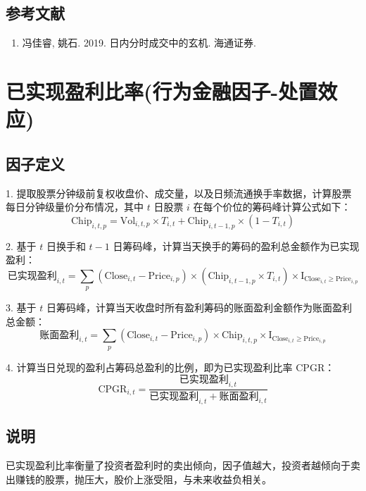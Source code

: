 \documentclass{article}
\begin{document}
\subsection{参考文献}
\begin{enumerate}
    \item 冯佳睿, 姚石. 2019. 日内分时成交中的玄机. 海通证券.
\end{enumerate}

\section{已实现盈利比率(行为金融因子-处置效应)}

\subsection{因子定义}

1. 提取股票分钟级前复权收盘价、成交量，以及日频流通换手率数据，计算股票每日分钟级量价分布情况，其中 \( t \) 日股票 \( i \) 在每个价位的筹码峰计算公式如下：
\begin{equation}
    \mathrm{Chip}_{i,t,p} = \mathrm{Vol}_{i,t,p} \times T_{i,t} + \mathrm{Chip}_{i,t-1,p} \times (1 - T_{i,t})
\end{equation}

2. 基于 \( t \) 日换手和 \( t-1 \) 日筹码峰，计算当天换手的筹码的盈利总金额作为已实现盈利：
\begin{equation}
    \text{已实现盈利}_{i,t} = \sum_p (\mathrm{Close}_{i,t} - \mathrm{Price}_{i,p}) \times (\mathrm{Chip}_{i,t-1,p} \times T_{i,t}) \times \mathrm{I}_{\mathrm{Close}_{i,t} \geq \mathrm{Price}_{i,p}}
\end{equation}

3. 基于 \( t \) 日筹码峰，计算当天收盘时所有盈利筹码的账面盈利金额作为账面盈利总金额：
\begin{equation}
    \text{账面盈利}_{i,t} = \sum_p (\mathrm{Close}_{i,t} - \mathrm{Price}_{i,p}) \times \mathrm{Chip}_{i,t,p} \times \mathrm{I}_{\mathrm{Close}_{i,t} \geq \mathrm{Price}_{i,p}}
\end{equation}

4. 计算当日兑现的盈利占筹码总盈利的比例，即为已实现盈利比率 \( \mathrm{CPGR} \)：
\begin{equation}
    \mathrm{CPGR}_{i,t} = \frac{\text{已实现盈利}_{i,t}}{\text{已实现盈利}_{i,t} + \text{账面盈利}_{i,t}}
\end{equation}

\subsection{说明}
已实现盈利比率衡量了投资者盈利时的卖出倾向，因子值越大，投资者越倾向于卖出赚钱的股票，抛压大，股价上涨受阻，与未来收益负相关。
\end{document}
